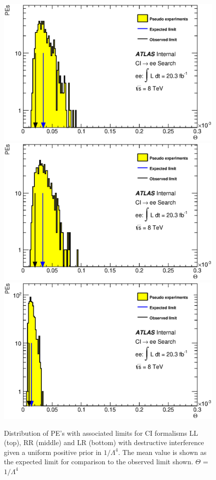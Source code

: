     \begin{figure}[h]
        \begin{center}
            \includegraphics[width=0.7\linewidth]{images/ee__LL_plus_L4/Theta.eps}
            \includegraphics[width=0.7\linewidth]{images/ee__RR_plus_L4/Theta.eps}
            \includegraphics[width=0.7\linewidth]{images/ee__LR_plus_L4/Theta.eps}
        \end{center}
       \caption{Distribution of PE's with associated limits for CI formalisms LL (top), RR (middle) and LR (bottom) with destructive interference given a uniform positive prior in $1/\Lambda^{4}$. The mean value is shown as the expected limit for comparison to the observed limit shown. $\Theta$ = $1/\Lambda^{4}$}
       \label{fig:Theta_CI_des_4}
    \end{figure}








